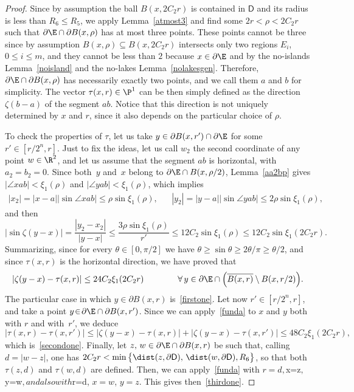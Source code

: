 \begin{proof}
Since by assumption the ball $B(x,2C_2 r)$ is contained in $\mathsf{D}$ and its radius is less than $R_6\leq R_5$, we apply Lemma~\ref{atmost3} and find some $2r < \rho< 2C_2 r$ such that $\partial\E\cap \partial B(x,\rho)$ has at most three points. These points cannot be three since by assumption $B(x,\rho)\subseteq B(x,2C_2 r)$ intersects only two regions $E_i$, $0\leq i \leq m$, and they cannot be less than $2$ because $x\in\partial\E$ and by the no-islands Lemma~\ref{noisland} and the no-lakes Lemma~\ref{nolakesgen}. Therefore, $\partial\E\cap \partial B(x,\rho)$ has necessarily exactly two points, and we call them $a$ and $b$ for simplicity. The vector $\tau(x,r)\in\P^1$ can be then simply defined as the direction $\zeta(b-a)$ of the segment $ab$. Notice that this direction is not uniquely determined by $x$ and $r$, since it also depends on the particular choice of $\rho$.\par
To check the properties of $\tau$, let us take $y\in \partial B(x,r')\cap\partial\E$ for some $r'\in[r/2^n,r]$. Just to fix the ideas, let us call $w_2$ the second coordinate of any point $w\in\R^2$, and let us assume that the segment $ab$ is horizontal, with $a_2=b_2=0$. Since both~$y$ and~$x$ belong to $\partial\E\cap B(x,\rho/2)$, Lemma~\ref{aa2bp} gives $|\angle xab|< \xi_1(\rho)$ and $|\angle yab|<\xi_1(\rho)$, which implies
\begin{align*}
|x_2| = |x-a| |\sin \angle xab| \leq \rho \sin \xi_1(\rho), &&
|y_2| = |y-a| |\sin \angle yab| \leq 2 \rho \sin \xi_1(\rho),
\end{align*}
and then
\[
|\sin \zeta(y-x)| =\frac{|y_2-x_2|}{|y-x|} \leq \frac{3 \rho\sin \xi_1(\rho)}{r'} \leq 12 C_2 \sin \xi_1(\rho)\leq 12 C_2 \sin \xi_1(2C_2 r).
\]
Summarizing, since for every $\theta\in[0,\pi/2]$ we have $\theta\geq\sin\theta\geq 2\theta/\pi\geq \theta/2$, and since $\tau(x,r)$ is the horizontal direction, we have proved that
\begin{equation}\label{funda}
|\zeta(y-x)-\tau(x,r)| \leq 24 C_2 \xi_1(2C_2 r) \qquad\qquad \forall \, y \in \partial\E\cap \Big(\overline{B(x,r)}\setminus B(x,r/2)\Big).
\end{equation}
The particular case in which $y\in\partial B(x,r)$ is~\eqref{firstone}. Let now $r'\in[r/2^n,r]$, and take a point $y\!\in\! \partial\E\cap\partial B(x,r')$. Since we can apply~\eqref{funda} to $x$ and $y$ both with $r$ and with~$r'$, we deduce
\[
|\tau(x,r)-\tau(x,r')| \leq |\zeta(y-x)-\tau(x,r)| + |\zeta(y-x)-\tau(x,r')|\leq 48 C_2 \xi_1(2C_2 r),
\]
which is~\eqref{secondone}. Finally, let $z,\,w \in \partial \E \cap \partial B(x,r)$ be such that, calling $d=|w-z|$, one has $2C_2 r < \min\big\{\dist (z,\partial \mathsf{D}),\, \dist(w,\partial \mathsf{D}), R_6\big\}$, so that both $\tau(z,d)$ and $\tau(w,d)$ are defined. Then, we can apply~\eqref{funda} with $r=d, $x=z$, $y=w$, and also with $r=d, $x=w$, $y=z$. This gives then~\eqref{thirdone}.
\end{proof}


